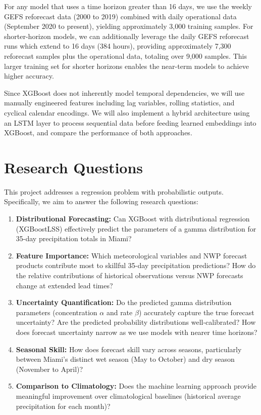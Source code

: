 \documentclass[11pt]{article}
\begin{document}
For any model that uses a time horizon greater than 16 days, we use the weekly GEFS reforecast data (2000 to 2019) combined with daily operational data (September 2020 to present), yielding approximately 3,000 training samples. For shorter-horizon models, we can additionally leverage the daily GEFS reforecast runs which extend to 16 days (384 hours), providing approximately 7,300 reforecast samples plus the operational data, totaling over 9,000 samples. This larger training set for shorter horizons enables the near-term models to achieve higher accuracy.

Since XGBoost does not inherently model temporal dependencies, we will use manually engineered features including lag variables, rolling statistics, and cyclical calendar encodings. We will also implement a hybrid architecture using an LSTM layer to process sequential data before feeding learned embeddings into XGBoost, and compare the performance of both approaches.

\section{Research Questions}

This project addresses a regression problem with probabilistic outputs. Specifically, we aim to answer the following research questions:

\begin{enumerate}
    \item \textbf{Distributional Forecasting:} Can XGBoost with distributional regression (XGBoostLSS) effectively predict the parameters of a gamma distribution for 35-day precipitation totals in Miami?

    \item \textbf{Feature Importance:} Which meteorological variables and NWP forecast products contribute most to skillful 35-day precipitation predictions? How do the relative contributions of historical observations versus NWP forecasts change at extended lead times?

    \item \textbf{Uncertainty Quantification:} Do the predicted gamma distribution parameters (concentration $\alpha$ and rate $\beta$) accurately capture the true forecast uncertainty? Are the predicted probability distributions well-calibrated? How does forecast uncertainty narrow as we use models with nearer time horizons?

    \item \textbf{Seasonal Skill:} How does forecast skill vary across seasons, particularly between Miami's distinct wet season (May to October) and dry season (November to April)?

    \item \textbf{Comparison to Climatology:} Does the machine learning approach provide meaningful improvement over climatological baselines (historical average precipitation for each month)?
\end{enumerate}
\end{document}
